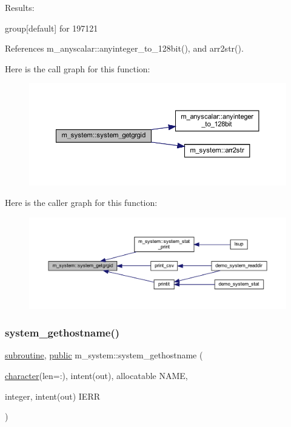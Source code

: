 Results\+:

group\mbox{[}default\mbox{]} for 197121 

References m\+\_\+anyscalar\+::anyinteger\+\_\+to\+\_\+128bit(), and arr2str().

Here is the call graph for this function\+:
\nopagebreak
\begin{figure}[H]
\begin{center}
\leavevmode
\includegraphics[width=350pt]{namespacem__system_aec137429fbb8c848db4ecd914466d7e8_cgraph}
\end{center}
\end{figure}
Here is the caller graph for this function\+:
\nopagebreak
\begin{figure}[H]
\begin{center}
\leavevmode
\includegraphics[width=350pt]{namespacem__system_aec137429fbb8c848db4ecd914466d7e8_icgraph}
\end{center}
\end{figure}
\mbox{\label{namespacem__system_a96fab225737afb77ff1cbba9866f0d05}} 
\subsubsection{\texorpdfstring{system\+\_\+gethostname()}{system\_gethostname()}}
{\footnotesize\ttfamily \hyperlink{M__stopwatch_83_8txt_acfbcff50169d691ff02d4a123ed70482}{subroutine}, \hyperlink{M__stopwatch_83_8txt_a2f74811300c361e53b430611a7d1769f}{public} m\+\_\+system\+::system\+\_\+gethostname (\begin{DoxyParamCaption}\item[{\hyperlink{option__stopwatch_83_8txt_abd4b21fbbd175834027b5224bfe97e66}{character}(len=\+:), intent(out), allocatable}]{N\+A\+ME,  }\item[{integer, intent(out)}]{I\+E\+RR }\end{DoxyParamCaption})}



